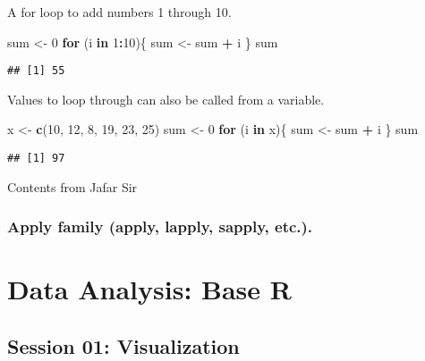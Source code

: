 \documentclass[
]{book}
\newenvironment{Shaded}{\begin{snugshade}}{\end{snugshade}}
\newcommand{\ControlFlowTok}[1]{\textcolor[rgb]{0.13,0.29,0.53}{\textbf{#1}}}
\newcommand{\DecValTok}[1]{\textcolor[rgb]{0.00,0.00,0.81}{#1}}
\newcommand{\KeywordTok}[1]{\textcolor[rgb]{0.13,0.29,0.53}{\textbf{#1}}}
\newcommand{\NormalTok}[1]{#1}
\newcommand{\OperatorTok}[1]{\textcolor[rgb]{0.81,0.36,0.00}{\textbf{#1}}}
\newcommand{\StringTok}[1]{\textcolor[rgb]{0.31,0.60,0.02}{#1}}
\begin{document}
A for loop to add numbers 1 through 10.

\begin{Shaded}
\begin{Highlighting}[]
\NormalTok{sum <-}\StringTok{ }\DecValTok{0}
\ControlFlowTok{for}\NormalTok{ (i }\ControlFlowTok{in} \DecValTok{1}\OperatorTok{:}\DecValTok{10}\NormalTok{)\{}
\NormalTok{  sum <-}\StringTok{ }\NormalTok{sum }\OperatorTok{+}\StringTok{ }\NormalTok{i}
\NormalTok{\}}
\NormalTok{sum}
\end{Highlighting}
\end{Shaded}

\begin{verbatim}
## [1] 55
\end{verbatim}

Values to loop through can also be called from a variable.

\begin{Shaded}
\begin{Highlighting}[]
\NormalTok{x <-}\StringTok{ }\KeywordTok{c}\NormalTok{(}\DecValTok{10}\NormalTok{, }\DecValTok{12}\NormalTok{, }\DecValTok{8}\NormalTok{, }\DecValTok{19}\NormalTok{, }\DecValTok{23}\NormalTok{, }\DecValTok{25}\NormalTok{)}
\NormalTok{sum <-}\StringTok{ }\DecValTok{0}
\ControlFlowTok{for}\NormalTok{ (i }\ControlFlowTok{in}\NormalTok{ x)\{}
\NormalTok{  sum <-}\StringTok{ }\NormalTok{sum }\OperatorTok{+}\StringTok{ }\NormalTok{i}
\NormalTok{\}}
\NormalTok{sum}
\end{Highlighting}
\end{Shaded}

\begin{verbatim}
## [1] 97
\end{verbatim}

{Contents from Jafar Sir}

\hypertarget{apply-family-apply-lapply-sapply-etc..}{%
\subsection{Apply family (apply, lapply, sapply, etc.).}\label{apply-family-apply-lapply-sapply-etc..}}

\hypertarget{rbase}{%
\chapter{Data Analysis: Base R}\label{rbase}}

\hypertarget{session-01-visualization}{%
\section{Session 01: Visualization}\label{session-01-visualization}}
\end{document}
